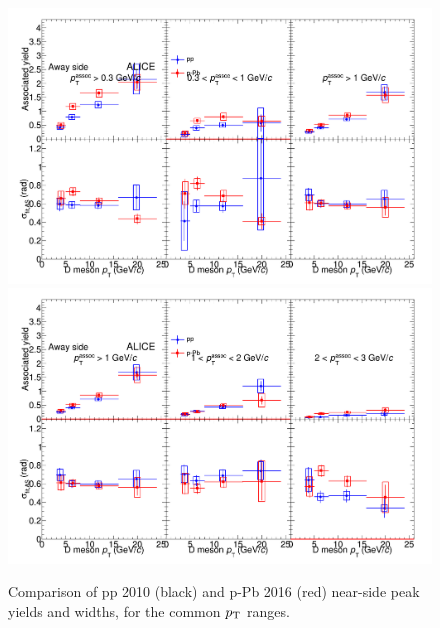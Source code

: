 \begin{figure}[!htbp]
\centering
{\includegraphics[width=\linewidth]{figures/CfrPPandModels/CompareFitResults_ppVspPb_5TeV_AwaySide_1.png}}
{\includegraphics[width=\linewidth]{figures/CfrPPandModels/CompareFitResults_ppVspPb_5TeV_AwaySide_2.png}}
\caption{Comparison of pp 2010 (black) and p-Pb 2016 (red) near-side peak yields and widths, for the common $p_{\rm T}$ ranges.}
\label{fig:CfrppObs}
\end{figure}
